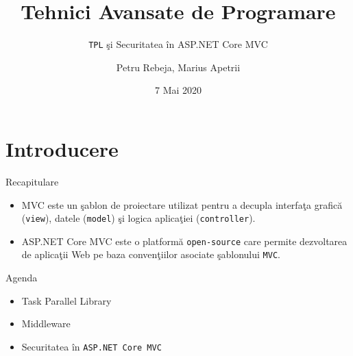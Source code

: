 \documentclass[presentation]{beamer}
\author{Petru Rebeja, Marius Apetrii}
\date{7 Mai 2020}
\title{Tehnici Avansate de Programare}
\subtitle{\texttt{TPL} şi Securitatea în ASP.NET Core MVC}
\institute[UAIC]{Facultatea de Matematică\\Universitatea Alexandru Ioan Cuza, Iași}
\begin{document}
\maketitle
\section{Introducere}
\label{sec:orgfd489bc}
\begin{frame}[label={sec:orgbf52ffb},fragile]{Recapitulare}
 \pause
\begin{itemize}
\item \alert{MVC} este un şablon de proiectare utilizat pentru a decupla interfaţa grafică (\texttt{view}), datele (\texttt{model}) şi logica aplicaţiei (\texttt{controller}).
\end{itemize}
\pause
\begin{itemize}
\item \alert{ASP.NET Core MVC} este o platformă \texttt{open-source} care permite dezvoltarea de aplicaţii Web pe baza convenţiilor asociate şablonului \texttt{MVC}.
\end{itemize}
\end{frame}
\begin{frame}[label={sec:org071b866},fragile]{Agenda}
 \begin{itemize}
\item Task Parallel Library
\item Middleware
\item Securitatea în \texttt{ASP.NET Core MVC}
\end{itemize}
\end{frame}
\end{document}
